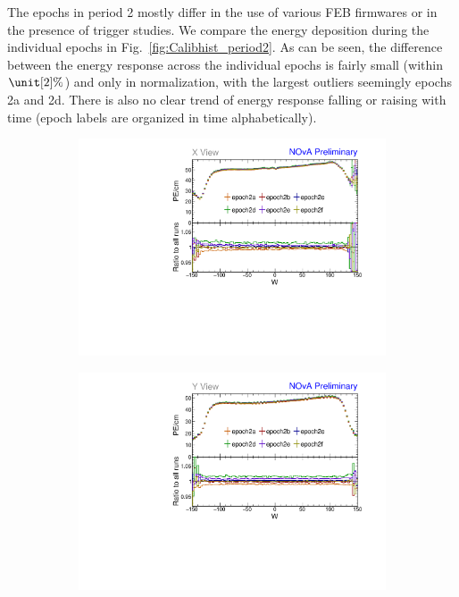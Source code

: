 The epochs in period 2 mostly differ in the use of various \gls{FEB} firmwares or in the presence of trigger studies. We compare the energy deposition during the individual epochs in Fig.~\ref{fig:Calibhist_period2}. As can be seen, the difference between the energy response across the individual epochs is fairly small (within $\unit[2]{\%}$) and only in normalization, with the largest outliers seemingly epochs 2a and 2d. There is also no clear trend of energy response falling or raising with time (epoch labels are organized in time alphabetically).

\begin{figure}[!hbtp]
\centering
\begin{subfigure}[b]{0.495\textwidth}
\centering
\includegraphics[width=\textwidth]{Plots/TBCalibration/Attenprofs_P2Data_WPE_corr_xy_X_Combined.pdf}
\end{subfigure}
\begin{subfigure}[b]{0.495\textwidth}
\centering
\includegraphics[width=\textwidth]{Plots/TBCalibration/Attenprofs_P2Data_WPE_corr_xy_Y_Combined.pdf}

\end{subfigure}
\end{figure}
